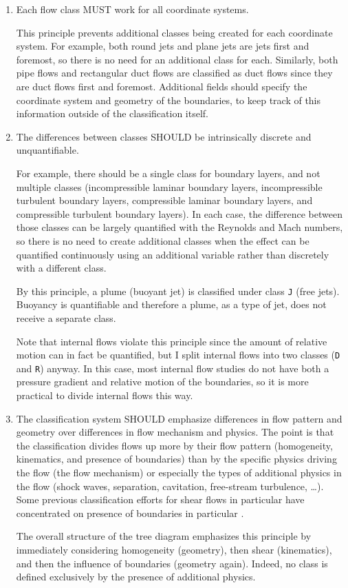 \begin{enumerate}
\item
Each flow class MUST work for all coordinate systems.

This principle prevents additional classes being created for each coordinate
system.  For example, both round jets and plane jets are jets first and
foremost, so there is no need for an additional class for each.  Similarly,
both pipe flows and rectangular duct flows are classified as duct flows since
they are duct flows first and foremost.  Additional fields should specify the
coordinate system and geometry of the boundaries, to keep track of this
information outside of the classification itself.


\item
The differences between classes SHOULD be intrinsically discrete and
unquantifiable.

For example, there should be a single class for boundary layers, and not
multiple classes (incompressible laminar boundary layers, incompressible
turbulent boundary layers, compressible laminar boundary layers, and
compressible turbulent boundary layers).  In each case, the difference between
those classes can be largely quantified with the Reynolds and Mach numbers, so
there is no need to create additional classes when the effect can be quantified
continuously using an additional variable rather than discretely with a
different class.

By this principle, a plume (buoyant jet) is classified under class \texttt{J}
(free jets).  Buoyancy is quantifiable and therefore a plume, as a type of jet,
does not receive a separate class.

Note that internal flows violate this principle since the amount of relative
motion can in fact be quantified, but I split internal flows into two classes
(\texttt{D} and \texttt{R}) anyway.  In this case, most internal flow studies
do not have both a pressure gradient and relative motion of the boundaries, so
it is more practical to divide internal flows this way.


\item
The classification system SHOULD emphasize differences in flow pattern and
geometry over differences in flow mechanism and physics.  The point is that the
classification divides flows up more by their flow pattern (homogeneity,
kinematics, and presence of boundaries) than by the specific physics driving
the flow (the flow mechanism) or especially the types of additional physics in
the flow (shock waves, separation, cavitation, free-stream turbulence, \ldots).
Some previous classification efforts for shear flows in particular have
concentrated on presence of boundaries in particular
\citep{KovasznayLSG+1967+eng+JOUR,FernholzHH+1976+eng+CHAP,ERCOFTAC+DBASE}.

The overall structure of the tree diagram emphasizes this principle by
immediately considering homogeneity (geometry), then shear (kinematics), and
then the influence of boundaries (geometry again).  Indeed, no class is defined
exclusively by the presence of additional physics.


\end{enumerate}


